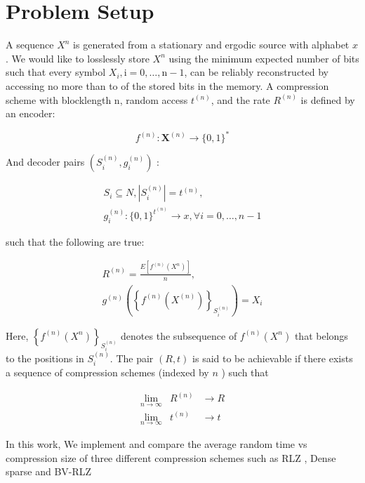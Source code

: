 \section{Problem Setup}

A sequence $X^{n}$ is generated from a stationary and ergodic source with alphabet $x$. We would like to losslessly store $X^{n}$ using the minimum expected number of bits such that every symbol $X_{i}, \mathrm{i}=0, \ldots, \mathrm{n-1}$, can be reliably reconstructed by accessing no more than to of the stored bits in the memory. A compression scheme with blocklength $\mathrm{n}$, random access $t^{(n)}$, and the rate $R^{(n)}$ is defined by an encoder:

$$
f^{(n)}: \boldsymbol{X}^{(n)} \rightarrow\{0,1\}^{*}
$$

And decoder pairs $\left(S_{i}^{(n)}, g_{i}^{(n)}\right)$ :

$$
\begin{gathered}
S_{i} \subseteq N,\left|S_{i}^{(n)}\right|=t^{(n)}, \\
g_{i}^{(n)}:\{0,1\}^{t^{(n)}} \rightarrow x, \forall i=0, \ldots, n-1
\end{gathered}
$$

such that the following are true:

$$
\begin{gathered}
R^{(n)}=\frac{E\left[f^{(n)}\left(X^{n}\right)\right]}{n}, \\
g^{(n)}\left(\left\{f^{(n)}\left(X^{(n)}\right)\right\}_{S_{i}^{(n)}}\right)=X_{i}
\end{gathered}
$$

Here, $\left\{f^{(n)}\left(X^{n}\right)\right\}_{S_{i}^{(n)}}$ denotes the subsequence of $f^{(n)}\left(X^{n}\right)$ that belongs to the positions in $S_{i}^{(n)}$. The pair $(R, t)$ is said to be achievable if there exists a sequence of compression schemes (indexed by $n$ ) such that

$$
\begin{array}{lll}
\lim _{n \rightarrow \infty} & R^{(n)} & \rightarrow R \\
\lim _{n \rightarrow \infty} & t^{(n)} & \rightarrow t
\end{array}
$$

In this work, We implement and compare the average random time vs compression size of three different compression schemes such as RLZ , Dense sparse and BV-RLZ 